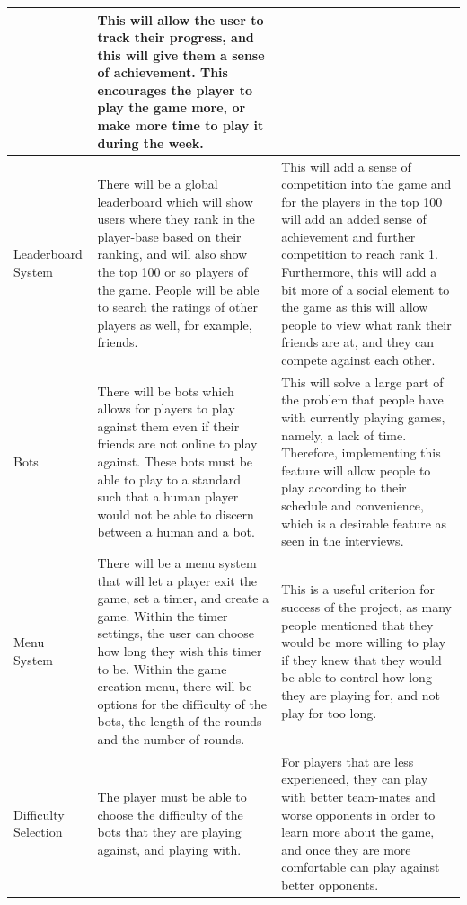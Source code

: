 \begin{center}
\begin{longtable}[c]{|p{2.7cm}|p{6.7cm}|p{5.7cm}|}
\begin{enumerate}
    \end{enumerate} & This will allow the user to track their progress, and this will give them a sense of achievement. This encourages the player to play the game more, or make more time to play it during the week.\\
    \hline
    Leaderboard System & There will be a global leaderboard which will show users where they rank in the player-base based on their ranking, and will also show the top 100 or so players of the game. People will be able to search the ratings of other players as well, for example, friends. & This will add a sense of competition into the game and for the players in the top 100 will add an added sense of achievement and further competition to reach rank 1. Furthermore, this will add a bit more of a social element to the game as this will allow people to view what rank their friends are at, and they can compete against each other.\\
    \hline
    Bots & There will be bots which allows for players to play against them even if their friends are not online to play against. These bots must be able to play to a standard such that a human player would not be able to discern between a human and a bot. & This will solve a large part of the problem that people have with currently playing games, namely, a lack of time. Therefore, implementing this feature will allow people to play according to their schedule and convenience, which is a desirable feature as seen in the interviews.\\
    \hline
    Menu System & There will be a menu system that will let a player exit the game, set a timer, and create a game. Within the timer settings, the user can choose how long they wish this timer to be. Within the game creation menu, there will be options for the difficulty of the bots, the length of the rounds and the number of rounds. & This is a useful criterion for success of the project, as many people mentioned that they would be more willing to play if they knew that they would be able to control how long they are playing for, and not play for too long.\\
    \hline
    Difficulty Selection & The player must be able to choose the difficulty of the bots that they are playing against, and playing with. & For players that are less experienced, they can play with better team-mates and worse opponents in order to learn more about the game, and once they are more comfortable can play against better opponents.\\
    \hline

\end{longtable}
\end{center}
